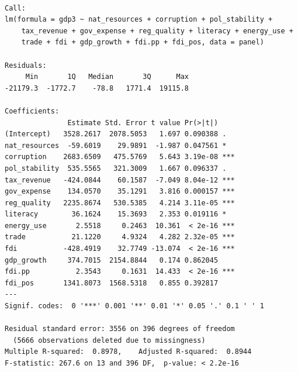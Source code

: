 \documentclass[
  letterpaper,
  DIV=11,
  numbers=noendperiod]{scrartcl}
\begin{document}
\begin{verbatim}

Call:
lm(formula = gdp3 ~ nat_resources + corruption + pol_stability + 
    tax_revenue + gov_expense + reg_quality + literacy + energy_use + 
    trade + fdi + gdp_growth + fdi.pp + fdi_pos, data = panel)

Residuals:
     Min       1Q   Median       3Q      Max 
-21179.3  -1772.7    -78.8   1771.4  19115.8 

Coefficients:
               Estimate Std. Error t value Pr(>|t|)    
(Intercept)   3528.2617  2078.5053   1.697 0.090388 .  
nat_resources  -59.6019    29.9891  -1.987 0.047561 *  
corruption    2683.6509   475.5769   5.643 3.19e-08 ***
pol_stability  535.5565   321.3009   1.667 0.096337 .  
tax_revenue   -424.0844    60.1587  -7.049 8.04e-12 ***
gov_expense    134.0570    35.1291   3.816 0.000157 ***
reg_quality   2235.8674   530.5385   4.214 3.11e-05 ***
literacy        36.1624    15.3693   2.353 0.019116 *  
energy_use       2.5518     0.2463  10.361  < 2e-16 ***
trade           21.1220     4.9324   4.282 2.32e-05 ***
fdi           -428.4919    32.7749 -13.074  < 2e-16 ***
gdp_growth     374.7015  2154.8844   0.174 0.862045    
fdi.pp           2.3543     0.1631  14.433  < 2e-16 ***
fdi_pos       1341.8073  1568.5318   0.855 0.392817    
---
Signif. codes:  0 '***' 0.001 '**' 0.01 '*' 0.05 '.' 0.1 ' ' 1

Residual standard error: 3556 on 396 degrees of freedom
  (5666 observations deleted due to missingness)
Multiple R-squared:  0.8978,    Adjusted R-squared:  0.8944 
F-statistic: 267.6 on 13 and 396 DF,  p-value: < 2.2e-16
\end{verbatim}
\end{document}
